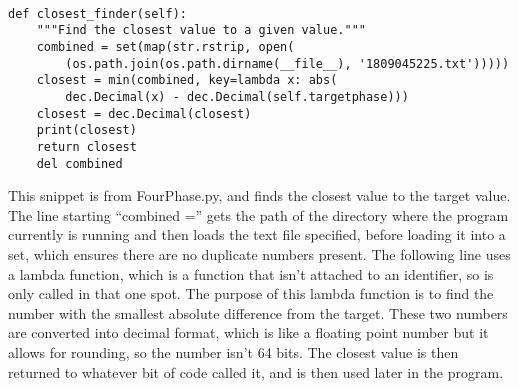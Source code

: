 \documentclass{article}
\newcommand{\q}[1]{``#1''}
\begin{document}
\begin{verbatim}

def closest_finder(self):
    """Find the closest value to a given value."""
    combined = set(map(str.rstrip, open(
        (os.path.join(os.path.dirname(__file__), '1809045225.txt')))))
    closest = min(combined, key=lambda x: abs(
        dec.Decimal(x) - dec.Decimal(self.targetphase)))
    closest = dec.Decimal(closest)
    print(closest)
    return closest
    del combined

\end{verbatim}
This snippet is from FourPhase.py, and finds the closest value to the target value. The line starting \q{combined =} gets the path of the directory where the program
currently is running and then loads the text file specified, before loading it into a set, which ensures there are no duplicate numbers present. The following line uses
a lambda function, which is a function that isn't attached to an identifier, so is only called in that one spot. The purpose of this lambda function is to find the
number with the smallest absolute difference from the target. These two numbers are converted into decimal format, which is like a floating point number but it allows
for rounding, so the number isn't 64 bits. The closest value is then returned to whatever bit of code called it, and is then used later in the program.
\end{document}
